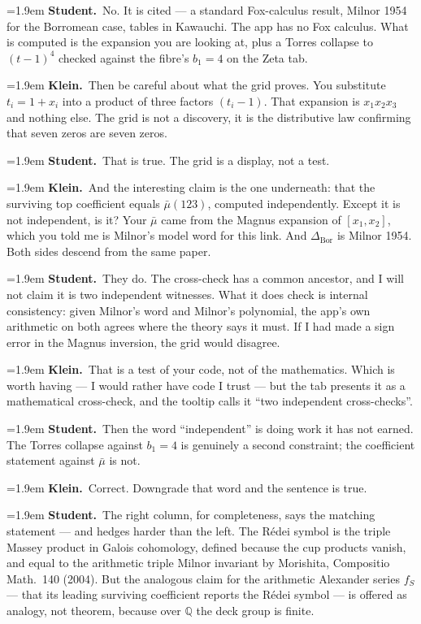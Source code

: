 \documentclass[11pt]{article}
\newcommand{\Stu}[1]{\par\smallskip\noindent\hangindent=1.9em\hangafter=1%
  \textcolor{stucol}{\textbf{Student.}}~#1\par}
\newcommand{\Kle}[1]{\par\smallskip\noindent\hangindent=1.9em\hangafter=1%
  \textcolor{klecol}{\textbf{Klein.}}~#1\par}
\begin{document}
\Stu{No. It is cited --- a standard Fox-calculus result, Milnor 1954 for the Borromean case, tables in Kawauchi. The app has no Fox calculus. What is computed is the expansion you are looking at, plus a Torres collapse to $(t-1)^4$ checked against the fibre's $b_1 = 4$ on the Zeta tab.}

\Kle{Then be careful about what the grid proves. You substitute $t_i = 1 + x_i$ into a product of three factors $(t_i - 1)$. That expansion is $x_1x_2x_3$ and nothing else. The grid is not a discovery, it is the distributive law confirming that seven zeros are seven zeros.}

\Stu{That is true. The grid is a display, not a test.}

\Kle{And the interesting claim is the one underneath: that the surviving top coefficient equals $\bar\mu(123)$, computed independently. Except it is not independent, is it? Your $\bar\mu$ came from the Magnus expansion of $[x_1, x_2]$, which you told me is Milnor's model word for this link. And $\Delta_{\mathrm{Bor}}$ is Milnor 1954. Both sides descend from the same paper.}

\Stu{They do. The cross-check has a common ancestor, and I will not claim it is two independent witnesses. What it does check is internal consistency: given Milnor's word and Milnor's polynomial, the app's own arithmetic on both agrees where the theory says it must. If I had made a sign error in the Magnus inversion, the grid would disagree.}

\Kle{That is a test of your code, not of the mathematics. Which is worth having --- I would rather have code I trust --- but the tab presents it as a mathematical cross-check, and the tooltip calls it ``two independent cross-checks''.}

\Stu{Then the word ``independent'' is doing work it has not earned. The Torres collapse against $b_1 = 4$ is genuinely a second constraint; the coefficient statement against $\bar\mu$ is not.}

\Kle{Correct. Downgrade that word and the sentence is true.}

\Stu{The right column, for completeness, says the matching statement --- and hedges harder than the left. The R\'edei symbol is the triple Massey product in Galois cohomology, defined because the cup products vanish, and equal to the arithmetic triple Milnor invariant by Morishita, Compositio Math.\ 140 (2004). But the analogous claim for the arithmetic Alexander series $f_S$ --- that its leading surviving coefficient reports the R\'edei symbol --- is offered as analogy, not theorem, because over $\mathbb{Q}$ the deck group is finite.}
\end{document}
